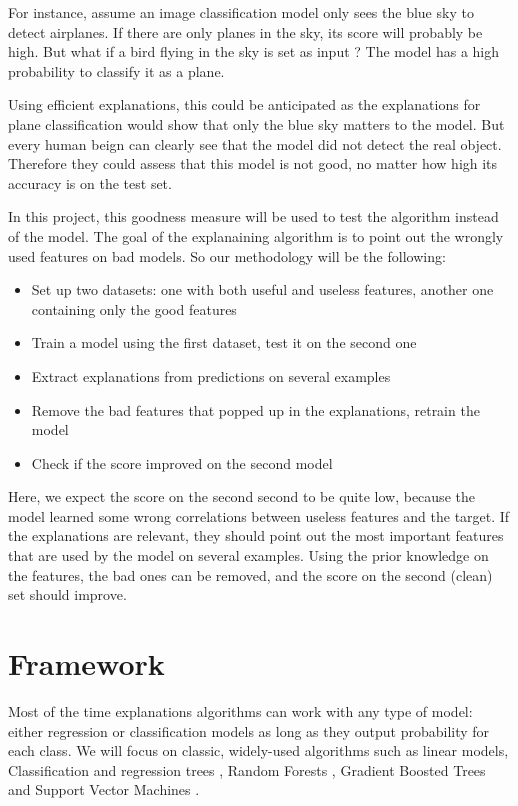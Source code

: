 \documentclass[a4paper,11pt]{kth-mag}
\begin{document}
For instance, assume an image classification model only sees the blue sky to detect airplanes. If there are only planes in the sky, its score will probably be high. But what if a bird flying in the sky is set as input ? The model has a high probability to classify it as a plane.

Using efficient explanations, this could be anticipated as the explanations for plane classification would show that only the blue sky matters to the model. But every human beign can clearly see that the model did not detect the real object. Therefore they could assess that this model is not good, no matter how high its accuracy is on the test set.

In this project, this goodness measure will be used to test the algorithm instead of the model. The goal of the explanaining algorithm is to point out the wrongly used features on bad models. So our methodology will be the following:

\begin{itemize}
	\item Set up two datasets: one with both useful and useless features, another one containing only the good features
	\item Train a model using the first dataset, test it on the second one
	\item Extract explanations from predictions on several examples
	\item Remove the bad features that popped up in the explanations, retrain the model
	\item Check if the score improved on the second model
\end{itemize}

Here, we expect the score on the second second to be quite low, because the model learned some wrong correlations between useless features and the target. If the explanations are relevant, they should point out the most important features that are used by the model on several examples. Using the prior knowledge on the features, the bad ones can be removed, and the score on the second (clean) set should improve.

\section{Framework}

Most of the time explanations algorithms can work with any type of model: either regression or classification models as long as they output probability for each class. We will focus on classic, widely-used algorithms such as linear models, Classification and regression trees \cite{cart}, Random Forests \cite{Breiman2001}, Gradient Boosted Trees \cite{Friedman2001} and Support Vector Machines \cite{Vapnik1992}.
\end{document}
